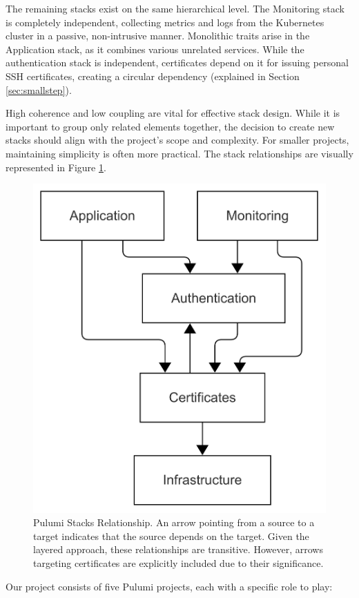 The remaining stacks exist on the same hierarchical level. The Monitoring stack is completely independent, collecting metrics and logs from the Kubernetes cluster in a passive, non-intrusive manner. Monolithic traits arise in the Application stack, as it combines various unrelated services. While the authentication stack is independent, certificates depend on it for issuing personal SSH certificates, creating a circular dependency (explained in Section \ref{sec:smallstep}).

High coherence and low coupling are vital for effective stack design. While it is important to group only related elements together, the decision to create new stacks should align with the project's scope and complexity. For smaller projects, maintaining simplicity is often more practical. The stack relationships are visually represented in Figure \ref{fig:pulumi_stacks}.

\begin{figure}[h]
    \centering
    \includegraphics[width=.5\textwidth]{images/pulumi_stacks.png}
    \caption{Pulumi Stacks Relationship. An arrow pointing from a source to a target indicates that the source depends on the target. Given the layered approach, these relationships are transitive. However, arrows targeting certificates are explicitly included due to their significance.}
    \label{fig:pulumi_stacks}
\end{figure}

Our project consists of five Pulumi projects, each with a specific role to play:

